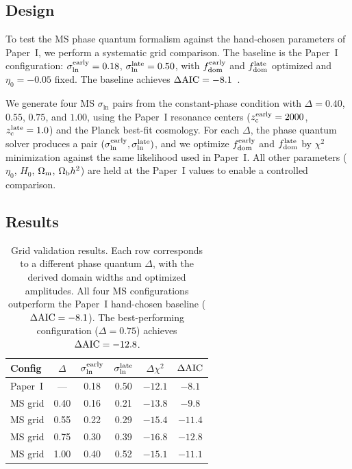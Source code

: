 \documentclass[aps,prd,twocolumn,superscriptaddress,nofootinbib]{revtex4-2}
\newcommand{\Om}{\Omega_{\rm m}}
\newcommand{\Ob}{\Omega_{\rm b}}
\newcommand{\fdom}{f_{\rm dom}}
\newcommand{\zc}{z_{\rm c}}
\newcommand{\sln}{\sigma_{\ln}}
\newcommand{\Hubble}{H_0}
\newcommand{\dAIC}{\Delta{\rm AIC}}
\newcommand{\dchi}{\Delta\chi^2}
\newcommand{\etaz}{\eta_0}
\begin{document}
\subsection{Design}
\label{sec:grid_design}

To test the MS phase quantum formalism against the hand-chosen
parameters of Paper~I, we perform a systematic grid comparison.
The baseline is the Paper~I configuration: $\sln^{\rm early} = 0.18$,
$\sln^{\rm late} = 0.50$, with $\fdom^{\rm early}$ and $\fdom^{\rm
late}$ optimized and $\etaz = -0.05$ fixed. The baseline achieves
$\dAIC = -8.1$~\cite{Paper1}.

We generate four MS $\sln$ pairs from the constant-phase condition
with $\Delta = 0.40$, $0.55$, $0.75$, and $1.00$, using the Paper~I
resonance centers ($\zc^{\rm early} = 2000$, $\zc^{\rm late} = 1.0$)
and the Planck best-fit cosmology. For each $\Delta$, the phase
quantum solver produces a pair $(\sln^{\rm early}, \sln^{\rm late})$,
and we optimize $\fdom^{\rm early}$ and $\fdom^{\rm late}$ by
$\chi^2$ minimization against the same likelihood used in Paper~I.
All other parameters ($\etaz$, $\Hubble$, $\Om$, $\Ob h^2$) are held
at the Paper~I values to enable a controlled comparison.

\subsection{Results}
\label{sec:grid_results}

\begin{table}[t]
\centering
\caption{Grid validation results. Each row corresponds to a different
  phase quantum $\Delta$, with the derived domain widths and optimized
  amplitudes. All four MS configurations outperform the Paper~I
  hand-chosen baseline ($\dAIC = -8.1$). The best-performing
  configuration ($\Delta = 0.75$) achieves $\dAIC = -12.8$.}
\label{tab:grid}
\begin{ruledtabular}
\begin{tabular}{lccccc}
Config & $\Delta$ & $\sln^{\rm early}$ & $\sln^{\rm late}$ &
$\dchi$ & $\dAIC$ \\
\hline
Paper~I & --- & 0.18 & 0.50 & $-12.1$ & $-8.1$ \\
MS grid & 0.40 & 0.16 & 0.21 & $-13.8$ & $-9.8$ \\
MS grid & 0.55 & 0.22 & 0.29 & $-15.4$ & $-11.4$ \\
MS grid & 0.75 & 0.30 & 0.39 & $-16.8$ & $-12.8$ \\
MS grid & 1.00 & 0.40 & 0.52 & $-15.1$ & $-11.1$ \\
\end{tabular}
\end{ruledtabular}
\end{table}
\end{document}
